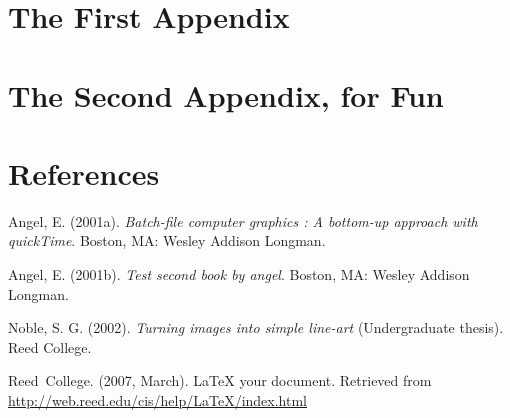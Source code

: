 \documentclass[12pt,twoside]{reedthesis}
\begin{document}
  \appendix
  \chapter{The First Appendix} \chapter{The Second Appendix, for Fun}
  
  \backmatter
  
  \chapter{References}
  
  \noindent
  
  \setlength{\parindent}{-0.5in} \setlength{\leftskip}{0.5in}
  \setlength{\parskip}{8pt}
  
  Angel, E. (2001a). \emph{Batch-file computer graphics : A bottom-up
  approach with quickTime}. Boston, MA: Wesley Addison Longman.
  
  Angel, E. (2001b). \emph{Test second book by angel}. Boston, MA: Wesley
  Addison Longman.
  
  Noble, S. G. (2002). \emph{Turning images into simple line-art}
  (Undergraduate thesis). Reed College.
  
  Reed~College. (2007, March). LaTeX your document. Retrieved from
  \url{http://web.reed.edu/cis/help/LaTeX/index.html}


  \chapter{}

\end{document}

